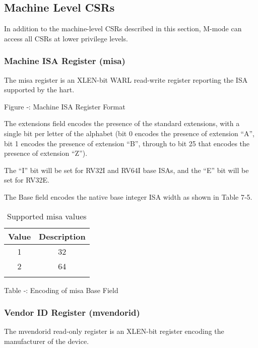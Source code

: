 \protect\hypertarget{_Toc326677757}{}{\protect\hypertarget{_Toc327108346}{}{}}

\subsection{Machine Level CSRs}\label{machine-level-csrs}

In addition to the machine-level CSRs described in this section, M-mode
can access all CSRs at lower privilege levels.

\subsubsection{Machine ISA Register
(misa)}\label{machine-isa-register-misa}

The misa register is an XLEN-bit WARL read-write register reporting the
ISA supported by the hart.

\missingfigure{}

Figure ‑: Machine ISA Register Format

The extensions field encodes the presence of the standard extensions,
with a single bit per letter of the alphabet (bit 0 encodes the presence
of extension ``A'', bit 1 encodes the presence of extension ``B'',
through to bit 25 that encodes the presence of extension ``Z'').

The ``I'' bit will be set for RV32I and RV64I base ISAs, and the ``E''
bit will be set for RV32E.

The Base field encodes the native base integer ISA width as shown in
Table 7‑5.

\begin{longtable}[]{@{}cc@{}}
\toprule
Value & Description\tabularnewline
\midrule
\endhead
1 & 32\tabularnewline
2 & 64\tabularnewline
\bottomrule
\caption{Supported misa values}
\label{tab:misa-values}
\end{longtable}

\protect\hypertarget{_Ref367027661}{}{}Table ‑: Encoding of misa Base
Field

\subsubsection{Vendor ID Register
(mvendorid)}\label{vendor-id-register-mvendorid}

The mvendorid read-only register is an XLEN-bit register encoding the
manufacturer of the device.

\missingfigure{}

